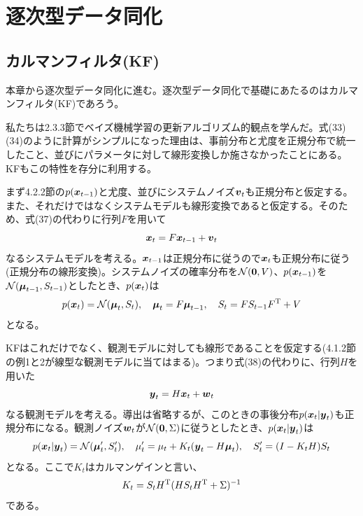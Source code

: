\documentclass[dvipdfmx, 9pt, a4paper]{jsarticle}
\newcommand{\bm}[1]{{\mbox{\boldmath $#1$}}}
\begin{document}
\section{逐次型データ同化}
\subsection{カルマンフィルタ(KF)}
本章から逐次型データ同化に進む。逐次型データ同化で基礎にあたるのはカルマンフィルタ(KF)であろう。\par
私たちは2.3.3節でベイズ機械学習の更新アルゴリズム的観点を学んだ。式(33)(34)のように計算がシンプルになった理由は、事前分布と尤度を正規分布で統一したこと、並びにパラメータに対して線形変換しか施さなかったことにある。KFもこの特性を存分に利用する。\par
まず4.2.2節の$p(\bm x_{t-1})$と尤度、並びにシステムノイズ$\bm v_t$も正規分布と仮定する。また、それだけではなくシステムモデルも線形変換であると仮定する。そのため、式(37)の代わりに行列$F$を用いて
\begin{equation}
\bm x_t=F\bm x_{t-1}+\bm v_t \notag
\end{equation}
なるシステムモデルを考える。$\bm x_{t-1}$は正規分布に従うので$\bm x_{t}$も正規分布に従う(正規分布の線形変換)。システムノイズの確率分布を$\mathcal{N}(\bm 0, V)$、$p(\bm x_{t-1})$を$\mathcal{N}(\bm \mu_{t-1}, S_{t-1})$としたとき、$p(\bm x_t)$は
\begin{equation}
p(\bm x_t)=\mathcal{N}(\bm \mu_t, S_t),~~~ \bm \mu_t=F\bm \mu_{t-1},~~~S_t=
FS_{t-1}F^{\rm T}+V
\end{equation}
となる。\par
KFはこれだけでなく、観測モデルに対しても線形であることを仮定する(4.1.2節の例1と2が線型な観測モデルに当てはまる)。つまり式(38)の代わりに、行列$H$を用いた
\begin{equation}
\bm y_t=H\bm x_t+\bm w_t \notag
\end{equation}
なる観測モデルを考える。導出は省略するが、このときの事後分布$p(\bm x_t|\bm y_t)$も正規分布になる。観測ノイズ$\bm w_t$が$\mathcal{N}(\bm 0, \Sigma)$に従うとしたとき、$p(\bm x_t|\bm y_t)$は
\begin{equation}
p(\bm x_t|\bm y_t)=\mathcal{N}(\bm \mu'_t, S'_t),~~~
\mu'_t=\mu_t+K_t(\bm y_t-H\bm \mu_t),~~~
S'_t=(I-K_tH)S_t
\end{equation}
となる。ここで$K_t$はカルマンゲインと言い、
\begin{equation}
K_t=S_tH^{\rm T}(HS_tH^{\rm T}+\Sigma)^{-1}
\end{equation}
である。\par
\end{document}
